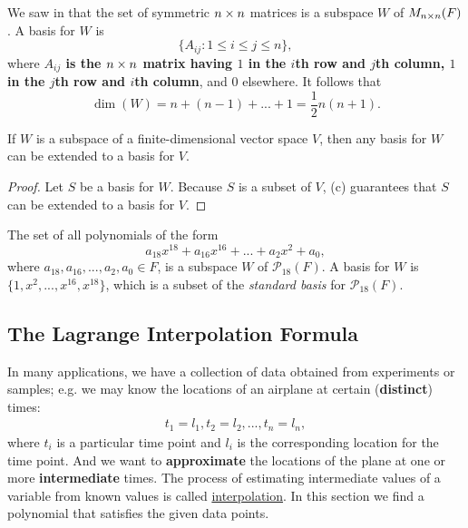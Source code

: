 \begin{example} \label{example 1.6.20}
We saw in  that the set of symmetric \(n \times n\) matrices is a subspace \(W\) of \(M_{n \times n}(F)\).
A basis for \(W\) is
\[
    \{ A_{ij} : 1 \le i \le j \le n \},
\]
where \textbf{\(A_{ij}\) is the \(n \times n\) matrix having \(1\) in the \(i\)th row and \(j\)th column, \(1\) in the \(j\)th row and \(i\)th column}, and \(0\) elsewhere.
It follows that
\[
    \dim(W) = n + (n - 1) + ... + 1 = \frac{1}{2}n(n + 1). 
\]
\end{example}

\begin{corollary} \label{corollary 1.11.1}
If \(W\) is a subspace of a finite-dimensional vector space \(V\), then any basis for \(W\) can be extended to a basis for \(V\).
\end{corollary}

\begin{proof}
Let \(S\) be a basis for \(W\).
Because \(S\) is a \LID{} subset of \(V\), (c) guarantees that \(S\) can be extended to a basis for \(V\).
\end{proof}

\begin{example} \label{example 1.6.21}
The set of all polynomials of the form
\[
    a_{18} x^{18} + a_{16} x^{16} + ... + a_2 x^2 + a_0,
\]
where \(a_{18}, a_{16}, ..., a_2, a_0 \in F\), is a subspace \(W\) of \(\mathcal{P}_{18}(F)\).
A basis for \(W\) is \(\{ 1, x^2, ..., x^{16}, x^{18} \}\), which is a subset of the \emph{standard basis} for \(\mathcal{P}_{18}(F)\).
\end{example}

\subsection{The Lagrange Interpolation Formula}
In many applications, we have a collection of data obtained from experiments or samples;
e.g. we may know the locations of an airplane at certain (\textbf{distinct}) times:
\begin{align*}
    t_1 = l_1,
    t_2 = l_2,
    ...,
    t_n = l_n,
\end{align*}
where \(t_i\) is a particular time point and \(l_i\) is the corresponding location for the time point.
And we want to \textbf{approximate} the locations of the plane at one or more \textbf{intermediate} times.
The process of estimating intermediate values of a variable from known values is called \href{https://www.wikiwand.com/en/Interpolation}{interpolation}.
In this section we find a polynomial that satisfies the given data points.

